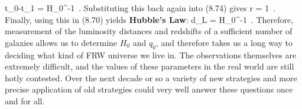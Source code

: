 \be
  t_0-t_1 = H_0^{-1}\ .\label{8.76}
\ee
Substituting this back again into (8.74) gives
\be
  r = {1}\ .\label{8.77}
\ee
Finally, using this in (8.70) yields {\bf Hubble's Law}:
\be
  d_L = H_0^{-1}\ .
  \label{8.78}
\ee
Therefore, measurement of the luminosity distances and redshifts
of a sufficient number of galaxies allows us to determine $H_0$
and $q_0$, and therefore takes us a long way to deciding what kind
of FRW universe we live in.  The observations themselves are
extremely difficult, and the values of these parameters in the
real world are still hotly contested.  Over the next decade or so
a variety of new strategies and more precise application of
old strategies could very well answer these questions once and for
all.





